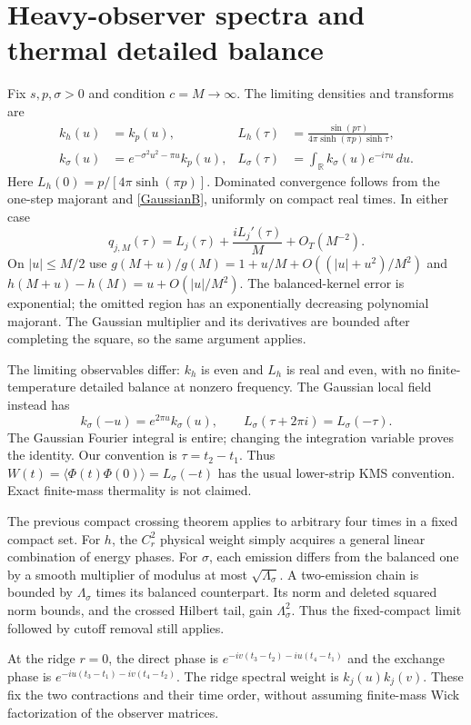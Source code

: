 \documentclass[11pt,a4paper]{article}
\begin{document}
\newpage
\section{Heavy-observer spectra and thermal detailed balance}
Fix $s,p,\sigma>0$ and condition $c=M\to\infty$.
The limiting densities and transforms are
\begin{align}
 k_h(u)&=k_p(u),&
 L_h(\tau)&=\frac{\sin(p\tau)}
                    {4\pi\sinh(\pi p)\sinh\tau},\nonumber\\
 k_\sigma(u)&=e^{-\sigma^2u^2-\pi u}k_p(u),&
 L_\sigma(\tau)&=\int_{\mathbb R}k_\sigma(u)e^{-i\tau u}\,du .
 \label{limits}
\end{align}
Here $L_h(0)=p/[4\pi\sinh(\pi p)]$.
Dominated convergence follows from the one-step majorant and
\eqref{GaussianB}, uniformly on compact real times. In either case
\[
 q_{j,M}(\tau)=L_j(\tau)+\frac{iL_j'(\tau)}M+O_T(M^{-2}).
\]
On $|u|\le M/2$ use $g(M+u)/g(M)=1+u/M+
O((|u|+u^2)/M^2)$ and
$h(M+u)-h(M)=u+O(|u|/M^2)$.
The balanced-kernel error is exponential; the omitted region has an
exponentially decreasing polynomial majorant.
The Gaussian multiplier and its derivatives are bounded after
completing the square, so the same argument applies.

The limiting observables differ: $k_h$ is even and $L_h$ is real and
even, with no finite-temperature detailed balance at nonzero frequency.
The Gaussian local field instead has
\begin{equation}
 k_\sigma(-u)=e^{2\pi u}k_\sigma(u),\qquad
 L_\sigma(\tau+2\pi i)=L_\sigma(-\tau).
 \label{KMS}
\end{equation}
The Gaussian Fourier integral is entire; changing the integration
variable proves the identity. Our convention is $\tau=t_2-t_1$.
Thus $W(t)=\langle\Phi(t)\Phi(0)\rangle=L_\sigma(-t)$ has the usual
lower-strip KMS convention. Exact finite-mass thermality is not claimed.

The previous compact crossing theorem applies to arbitrary four times
in a fixed compact set. For $h$, the $C_r^2$ physical weight simply
acquires a general linear combination of energy phases.
For $\sigma$, each emission differs from the balanced one by a smooth
multiplier of modulus at most $\sqrt{\Lambda_\sigma}$.
A two-emission chain is bounded by $\Lambda_\sigma$ times its
balanced counterpart. Its norm and deleted squared norm bounds,
and the crossed Hilbert tail, gain $\Lambda_\sigma^2$.
Thus the fixed-compact limit followed by cutoff removal still applies.

At the ridge $r=0$, the direct phase is
$e^{-iv(t_3-t_2)-iu(t_4-t_1)}$ and the exchange phase is
$e^{-iu(t_3-t_1)-iv(t_4-t_2)}$.
The ridge spectral weight is $k_j(u)k_j(v)$.
These fix the two contractions and their time order, without assuming
finite-mass Wick factorization of the observer matrices.
\end{document}
